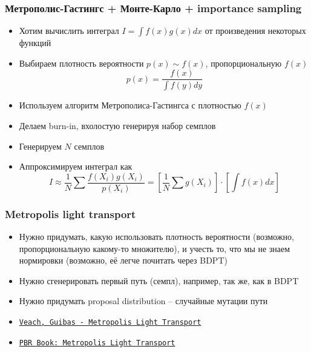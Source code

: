 \documentclass[10pt]{beamer}
\begin{document}
\begin{frame}
\frametitle{Метрополис-Гастингс + Монте-Карло + importance sampling}
\begin{itemize}
\item Хотим вычислить интеграл \begin{math}I=\int f(x)g(x)dx\end{math} от произведения некоторых функций
\pause
\item Выбираем плотность вероятности \begin{math}p(x) \sim f(x)\end{math}, пропорциональную \begin{math}f(x)\end{math}
\begin{equation*}p(x) = \frac{f(x)}{\int f(y)dy}\end{equation*}
\pause
\item Используем алгоритм Метрополиса-Гастингса с плотностью \begin{math}f(x)\end{math}
\pause
\item Делаем burn-in, вхолостую генерируя набор семплов
\pause
\item Генерируем \begin{math}N\end{math} семплов
\pause
\item Аппроксимируем интеграл как
\begin{equation*}I \approx \frac{1}{N}\sum \frac{f(X_i)g(X_i)}{p(X_i)} = \left[\frac{1}{N}\sum g(X_i)\right]\cdot \left[\int f(x) dx\right]\end{equation*}
\end{itemize}
\end{frame}

\begin{frame}
\frametitle{Metropolis light transport}
\begin{itemize}
\item Нужно придумать, какую использовать плотность вероятности (возможно, пропорциональную какому-то множителю), и учесть то, что мы не знаем нормировки (возможно, её легче почитать через BDPT)
\pause
\item Нужно сгенерировать первый путь (семпл), например, так же, как в BDPT
\pause
\item Нужно придумать proposal distribution -- случайные мутации пути
\pause
\item \href{https://graphics.stanford.edu/papers/metro/metro.pdf}{\texttt{Veach, Guibas - Metropolis Light Transport}}
\item \href{https://www.pbr-book.org/3ed-2018/Light_Transport_III_Bidirectional_Methods/Metropolis_Light_Transport}{\texttt{PBR Book: Metropolis Light Transport}}
\end{itemize}
\end{frame}
\end{document}
